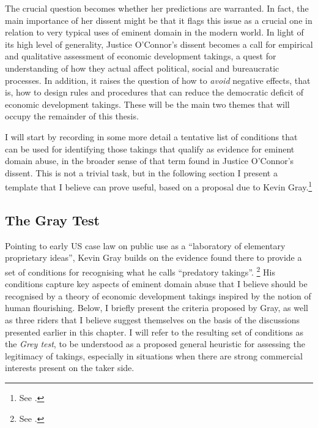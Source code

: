 The crucial question becomes whether her predictions are warranted. In fact, the main importance of her dissent might be that it flags this issue as a crucial one in relation to very typical uses of eminent domain in the modern world. In light of its high level of generality, Justice O'Connor's dissent becomes a call for empirical and qualitative assessment of economic development takings, a quest for understanding of how they actual affect political, social and bureaucratic processes. In addition, it raises the question of how to {\it avoid} negative effects, that is, how to design rules and procedures that can reduce the democratic deficit of economic development takings. These will be the main two themes that will occupy the remainder of this thesis.

I will start by recording in some more detail a tentative list of conditions that can be used for identifying those takings that qualify as evidence for eminent domain abuse, in the broader sense of that term found in Justice O'Connor's dissent. This is not a trivial task, but in the following section I present a template that I believe can prove useful, based on a proposal due to Kevin Gray.\footnote{See \cite{gray11}.}


\subsection{The Gray Test}\label{sec:gt}

Pointing to early US case law on public use as a ``laboratory of elementary proprietary ideas'', Kevin Gray builds on the evidence found there to provide a set of conditions for recognising what he calls ``predatory takings''. \footnote{See \cite[28-30]{gray11}.} His conditions capture key aspects of eminent domain abuse that I believe should be recognised by a theory of economic development takings inspired by the notion of human flourishing. Below, I briefly present the criteria proposed by Gray, as well as three riders that I believe suggest themselves on the basis of the discussions presented earlier in this chapter. I will refer to the resulting set of conditions as the {\it Grey test}, to be understood as a proposed general heuristic for assessing the legitimacy of takings, especially in situations when there are strong commercial interests present on the taker side. %

